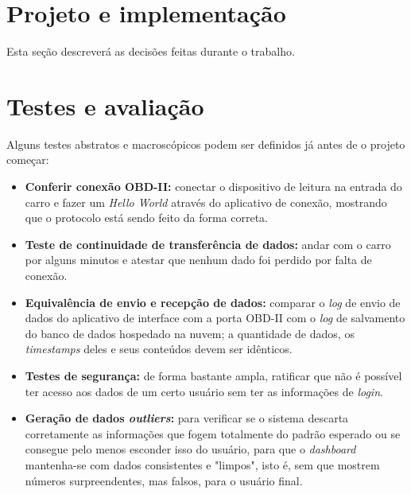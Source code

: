 \section{Projeto e implementação}
Esta seção descreverá as decisões feitas durante o trabalho.

\section{Testes e avaliação}
Alguns testes abstratos e macroscópicos podem ser definidos já antes de o projeto começar:

\begin{itemize}
    \item \textbf{Conferir conexão OBD-II:} conectar o dispositivo de leitura na entrada do carro e fazer um \textit{Hello World} através do aplicativo de conexão, mostrando que o protocolo está sendo feito da forma correta.
    
    \item \textbf{Teste de continuidade de transferência de dados:} andar com o carro por alguns minutos e atestar que nenhum dado foi perdido por falta de conexão.
    
    \item \textbf{Equivalência de envio e recepção de dados:} comparar o \textit{log} de envio de dados do aplicativo de interface com a porta OBD-II com o \textit{log} de salvamento do banco de dados hospedado na nuvem; a quantidade de dados, os \textit{timestamps} deles e seus conteúdos devem ser idênticos. 
    
    \item \textbf{Testes de segurança:} de forma bastante ampla, ratificar que não é possível ter acesso aos dados de um certo usuário sem ter as informações de \textit{login}.
    
    \item \textbf{Geração de dados \textit{outliers}:} para verificar se o sistema descarta corretamente as informações que fogem totalmente do padrão esperado ou se consegue pelo menos esconder isso do usuário, para que o \textit{dashboard} mantenha-se com dados consistentes e "limpos", isto é, sem que mostrem números surpreendentes, mas falsos, para o usuário final.
    
\end{itemize}


